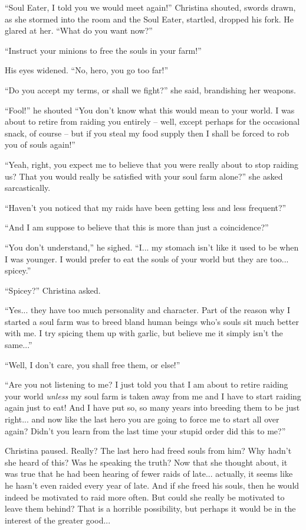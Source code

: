\documentclass[showtrims,b6paper,draft,10pt]{memoir}
\begin{document}
``Soul Eater, I told you we would meet again!''  Christina shouted, swords drawn, as she stormed into the room and the Soul Eater, startled, dropped his fork.  He glared at her.  ``What do you want now?''

``Instruct your minions to free the souls in your farm!''

His eyes widened.  ``No, hero, you go too far!''

``Do you accept my terms, or shall we fight?'' she said, brandishing her weapons.

``Fool!''  he shouted  ``You don't know what this would mean to your world.  I was about to retire from raiding you entirely -- well, except perhaps for the occasional snack, of course -- but if you steal my food supply then I shall be forced to rob you of souls again!''

``Yeah, right, you expect me to believe that you were really about to stop raiding us?  That you would really be satisfied with your soul farm alone?'' she asked sarcastically.

``Haven't you noticed that my raids have been getting less and less frequent?''

``And I am suppose to believe that this is more than just a coincidence?''

``You don't understand,'' he sighed.   ``I... my stomach isn't like it used to be when I was younger.  I would prefer to eat the souls of your world but they are too... spicey.''

``Spicey?''  Christina asked.

``Yes... they have too much personality and character.  Part of the reason why I started a soul farm was to breed bland human beings who's souls sit much better with me.  I try spicing them up with garlic, but believe me it simply isn't the same...''

``Well, I don't care, you shall free them, or else!''

``Are you not listening to me?  I just told you that I am about to retire raiding your world \emph{unless} my soul farm is taken away from me and I have to start raiding again just to eat!  And I have put so, so many years into breeding them to be just right...  and now like the last hero you are going to force me to start all over again?  Didn't you learn from the last time your stupid order did this to me?''

Christina paused.  Really?  The last hero had freed souls from him?  Why hadn't she heard of this?  Was he speaking the truth?  Now that she thought about, it was true that he had been hearing of fewer raids of late... actually, it seems like he hasn't even raided every year of late.  And if she freed his souls, then he would indeed be motivated to raid more often.  But could she really be motivated to leave them behind?  That is a horrible possibility, but perhaps it would be in the interest of the greater good...
\end{document}
